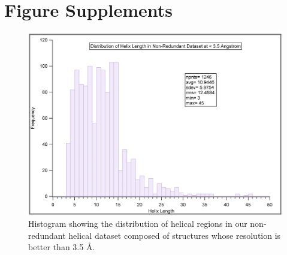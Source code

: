 \chapter{Figure Supplements}
\label{supplements}


\begin{figure}
\centering
\includegraphics[angle=0, scale=0.5]{Supplement/heldistrib.png}
\caption{Histogram showing the distribution of helical regions in our
  non-redundant helical dataset composed of structures whose
  resolution is better than 3.5 \AA.}
\label{fig:hellength}
\end{figure}





